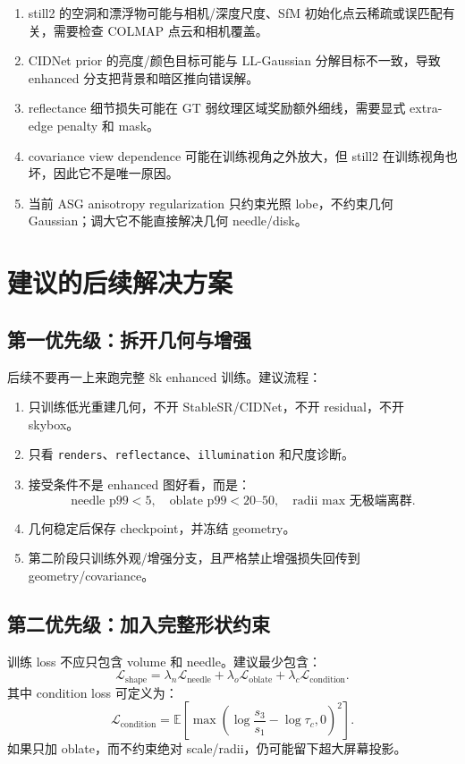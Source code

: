 \documentclass[11pt,a4paper]{article}
\begin{document}
\begin{enumerate}[leftmargin=1.5em]
  \item still2 的空洞和漂浮物可能与相机/深度尺度、SfM 初始化点云稀疏或误匹配有关，需要检查 COLMAP 点云和相机覆盖。
  \item CIDNet prior 的亮度/颜色目标可能与 LL-Gaussian 分解目标不一致，导致 enhanced 分支把背景和暗区推向错误解。
  \item reflectance 细节损失可能在 GT 弱纹理区域奖励额外细线，需要显式 extra-edge penalty 和 mask。
  \item covariance view dependence 可能在训练视角之外放大，但 still2 在训练视角也坏，因此它不是唯一原因。
  \item 当前 ASG anisotropy regularization 只约束光照 lobe，不约束几何 Gaussian；调大它不能直接解决几何 needle/disk。
\end{enumerate}

\section{建议的后续解决方案}

\subsection{第一优先级：拆开几何与增强}

后续不要再一上来跑完整 8k enhanced 训练。建议流程：
\begin{enumerate}[leftmargin=1.5em]
  \item 只训练低光重建几何，不开 StableSR/CIDNet，不开 residual，不开 skybox。
  \item 只看 \texttt{renders}、\texttt{reflectance}、\texttt{illumination} 和尺度诊断。
  \item 接受条件不是 enhanced 图好看，而是：
  \[
    \text{needle p99} < 5,\quad
    \text{oblate p99} < 20\text{--}50,\quad
    \text{radii max 无极端离群}.
  \]
  \item 几何稳定后保存 checkpoint，并冻结 geometry。
  \item 第二阶段只训练外观/增强分支，且严格禁止增强损失回传到 geometry/covariance。
\end{enumerate}

\subsection{第二优先级：加入完整形状约束}

训练 loss 不应只包含 volume 和 needle。建议最少包含：
\[
  \mathcal{L}_{\text{shape}}
  =
  \lambda_n \mathcal{L}_{\text{needle}}
  +
  \lambda_o \mathcal{L}_{\text{oblate}}
  +
  \lambda_c \mathcal{L}_{\text{condition}} .
\]
其中 condition loss 可定义为：
\[
  \mathcal{L}_{\text{condition}}
  =
  \mathbb{E}
  \left[
    \max\left(
      \log \frac{s_3}{s_1} - \log \tau_c,
      0
    \right)^2
  \right].
\]
如果只加 oblate，而不约束绝对 scale/radii，仍可能留下超大屏幕投影。
\end{document}
